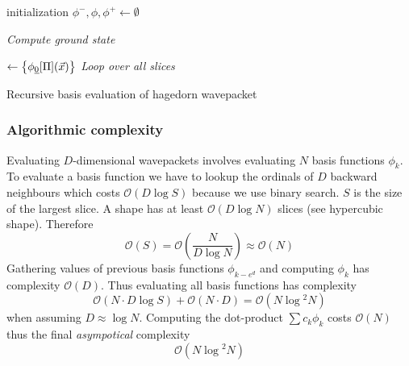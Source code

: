 \documentclass{article}
\begin{document}
\begin{algorithm}[H]
   initialization\;
  \(\phi^-, \phi, \phi^+ \gets \emptyset \)\;
 
  \emph{Compute ground state}\;
 
  \( \gets \left\{ \phi_{\underline{0}}[\Pi](\vec{x}) \right\} \)\;
  \emph{Loop over all slices}\;
  \caption{Recursive basis evaluation of hagedorn wavepacket}
\end{algorithm}

\subsubsection{Algorithmic complexity}
Evaluating \(D\)-dimensional wavepackets involves evaluating \(N\) basis functions \(\phi_k\).
To evaluate a basis function we have to lookup the ordinals of \(D\)
backward neighbours which costs \(\mathcal{O}(D \log{}S)\) because we use binary search.
\(S\) is the size of the largest slice. A shape has at least \(\mathcal{O}(D\log{}N)\)
slices (see hypercubic shape). Therefore
\[
  \mathcal{O}(S)=\mathcal{O}(\frac{N}{D\log{}N}) \approx \mathcal{O}(N)
\]
Gathering values of previous basis functions \(\phi_{k-e^d}\) and computing \(\phi_k\)
has complexity \(\mathcal{O}(D)\).
Thus evaluating all basis functions has complexity
\[
  \mathcal{O}(N \cdot D\log{}S) + \mathcal{O}(N \cdot D) =
  \mathcal{O}(N\log{}^2 N)
\]
when assuming \(D \approx \log{}N\).
Computing the dot-product \(\sum c_k\phi_k\) costs \(\mathcal{O}(N)\)
thus the final \emph{asympotical} complexity
\begin{equation}
  \label{eq:hawp_eval_complexity}
  \mathcal{O}(N\log{}^2N)
\end{equation}
\end{document}
